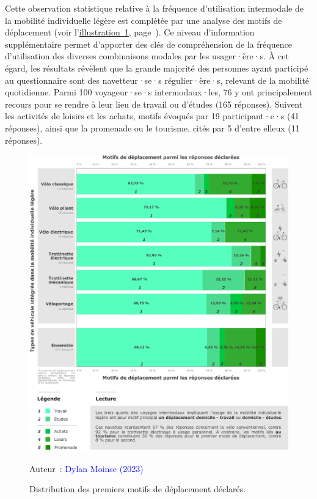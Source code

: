 \begin{refsegment}
Cette observation statistique relative à la fréquence d'utilisation intermodale de la mobilité individuelle légère est complétée par une analyse des motifs de déplacement (voir l'\hyperref[fig-chap4:motifs-modes]{illustration~\ref{fig-chap4:motifs-modes}}, page~\pageref{fig-chap4:motifs-modes}). Ce niveau d'information supplémentaire permet d’apporter des clés de compréhension de la fréquence d’utilisation des diverses combinaisons modales par les usager·ère·s. À cet égard, les résultats révèlent que la grande majorité des personnes ayant participé au questionnaire sont des navetteur·se·s régulier·ère·s, relevant de la mobilité quotidienne. Parmi 100 voyageur·se·s intermodaux·les, 76 y ont principalement recours pour se rendre à leur lieu de travail ou d'études (165 réponses). Suivent les activités de loisirs et les achats, motifs évoqués par 19 participant·e·s (41 réponses), ainsi que la promenade ou le tourisme, cités par 5 d'entre elleux (11 réponses).%

    \begin{figure}[h!]\vspace*{4pt}
        \caption{Distribution des premiers motifs de déplacement déclarés.}
        \label{fig-chap4:motifs-modes}
        \centerline{\includegraphics[width=1\columnwidth]{src/Figures/Chap-4/FR_Motifs.pdf}}
        \vspace{5pt}
        \begin{flushright}\scriptsize{
        Auteur~: \textcolor{blue}{Dylan Moinse (2023)}
        }\end{flushright}
    \end{figure}


\end{refsegment}
